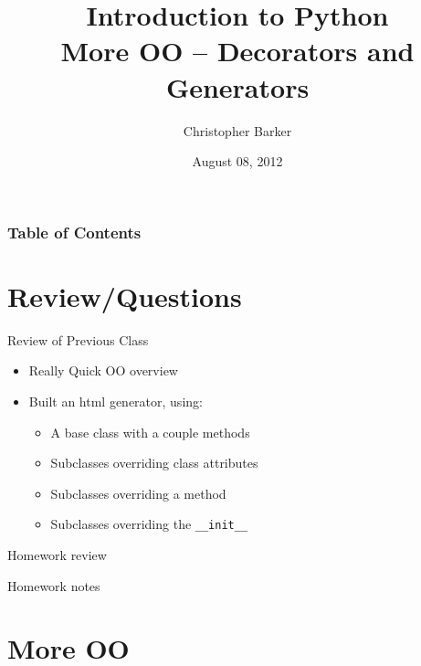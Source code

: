 \documentclass{beamer}
\title[Intro to Python: Week 7]{Introduction  to Python\\ More OO -- Decorators and Generators}
\author{Christopher Barker}
\institute{UW Continuing Education / Isilon}
\date{August 08, 2012}
\begin{document}
\begin{frame}
  \titlepage
\end{frame}

\begin{frame}
\frametitle{Table of Contents}
  \tableofcontents
\end{frame}


\section{Review/Questions}

\begin{frame}[fragile]{Review of Previous Class}

\begin{itemize}
  \item Really Quick OO overview
  \item Built an html generator, using: 
  \begin{itemize}
    \item A base class with a couple methods
    \item Subclasses overriding class attributes
    \item Subclasses overriding a method
    \item Subclasses overriding the \verb|__init__|
  \end{itemize}
\end{itemize}

\end{frame}


\begin{frame}{Homework review}

  {\Large Homework notes }

\end{frame}

\section{More OO}
\end{document}
